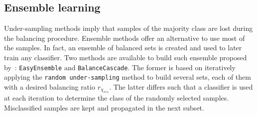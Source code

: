 \documentclass[twoside,11pt]{article}
\begin{document}
\subsection{Ensemble learning}

Under-sampling methods imply that samples of the majority class are lost during the balancing procedure.
Ensemble methods offer an alternative to use most of the samples.
In fact, an ensemble of balanced sets is created and used to later train any classifier.
Two methods are available to build such ensemble proposed by~\cite{liu2009exploratory}: \texttt{EasyEnsemble} and \texttt{BalanceCascade}.
The former is based on iteratively applying the \texttt{random under-sampling} method to build several sets, each of them with a desired balancing ratio $r_{\chi_{res}}$.
The latter differs such that a classifier is used at each iteration to determine the class of the randomly selected samples.
Misclassified samples are kept and propagated in the next subset.
\end{document}
